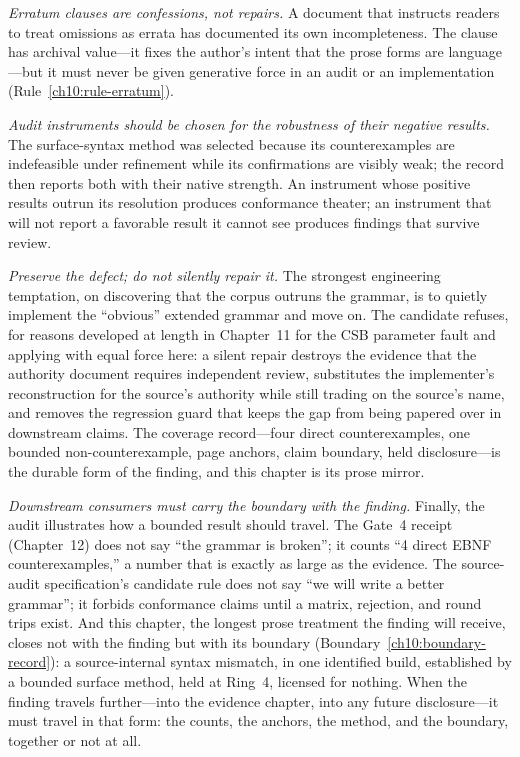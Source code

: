 \emph{Erratum clauses are confessions, not repairs.} A document that instructs readers to treat omissions as errata has documented its own incompleteness. The clause has archival value---it fixes the author's intent that the prose forms are language---but it must never be given generative force in an audit or an implementation (Rule~\ref{ch10:rule-erratum}).

\emph{Audit instruments should be chosen for the robustness of their negative results.} The surface-syntax method was selected because its counterexamples are indefeasible under refinement while its confirmations are visibly weak; the record then reports both with their native strength. An instrument whose positive results outrun its resolution produces conformance theater; an instrument that will not report a favorable result it cannot see produces findings that survive review.

\emph{Preserve the defect; do not silently repair it.} The strongest engineering temptation, on discovering that the corpus outruns the grammar, is to quietly implement the ``obvious'' extended grammar and move on. The candidate refuses, for reasons developed at length in Chapter~11 for the CSB parameter fault and applying with equal force here: a silent repair destroys the evidence that the authority document requires independent review, substitutes the implementer's reconstruction for the source's authority while still trading on the source's name, and removes the regression guard that keeps the gap from being papered over in downstream claims. The coverage record---four direct counterexamples, one bounded non-counterexample, page anchors, claim boundary, held disclosure---is the durable form of the finding, and this chapter is its prose mirror.

\emph{Downstream consumers must carry the boundary with the finding.} Finally, the audit illustrates how a bounded result should travel. The Gate~4 receipt (Chapter~12) does not say ``the grammar is broken''; it counts ``4 direct EBNF counterexamples,'' a number that is exactly as large as the evidence. The source-audit specification's candidate rule does not say ``we will write a better grammar''; it forbids conformance claims until a matrix, rejection, and round trips exist. And this chapter, the longest prose treatment the finding will receive, closes not with the finding but with its boundary (Boundary~\ref{ch10:boundary-record}): a source-internal syntax mismatch, in one identified build, established by a bounded surface method, held at Ring~4, licensed for nothing. When the finding travels further---into the evidence chapter, into any future disclosure---it must travel in that form: the counts, the anchors, the method, and the boundary, together or not at all.
